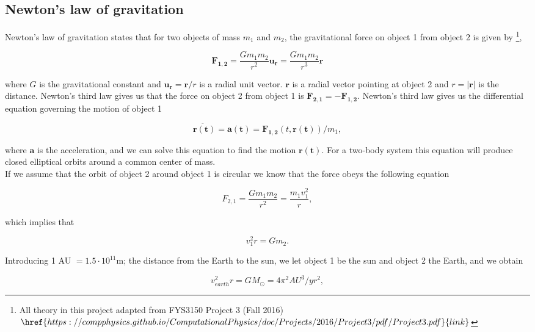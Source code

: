 \documentclass[%
 reprint,
 nobalance,
 amsmath,amssymb,
 aps,
]{revtex4-1}
\begin{document}
\subsection{\label{sec:New}Newton's law of gravitation}
Newton's law of gravitation states that for two objects of mass $m_1$ and $m_2$, the gravitational force on object 1 from object 2 is given by \footnote{All theory in this project adapted from FYS3150 Project 3 (Fall 2016) $\href{https://compphysics.github.io/ComputationalPhysics/doc/Projects/2016/Project3/pdf/Project3.pdf}{link}$},

\begin{equation}
	\bm{F_{1,2}} = \frac{Gm_1 m_2}{r^2} \bm{u_r} = \frac{Gm_1 m_2}{r^3} \bm{r}
\end{equation}

where $G$ is the gravitational constant and $\bm{u_r} = \bm{r}/r$ is a radial unit vector. $\bm{r}$ is a radial vector pointing at object 2 and $r = \left|\bm{r}\right| $ is the distance. Newton's third law gives us that the force on object 2 from object 1 is $\bm{F_{2,1}} = - \bm{F_{1,2}}$. Newton's third law gives us the differential equation governing the motion of object 1

\begin{equation}
	\bm{\ddot{r(t)}} = \bm{a(t)} = \bm{F_{1,2}}(t, \bm{r(t)})/m_1,
\end{equation}

where $\bm{a}$ is the acceleration, and we can solve this equation to find the motion $\bm{r(t)}$. For a two-body system this equation will produce closed elliptical orbits around a common center of mass.\\
If we assume that the orbit of object 2 around object 1 is circular we know that the force obeys the following equation

\begin{equation}
	F_{2,1} = \frac{Gm_1 m_2}{r^2} = \frac{m_1 v_{1}^{2}}{r},
\end{equation}

which implies that

\begin{equation}
	v_{1}^{2}r = G m_2.
\end{equation}

Introducing 1 AU $= 1.5\cdot10^{11}$m; the distance from the Earth to the sun, we let object 1 be the sun and object 2 the Earth, and we obtain

\begin{equation}
	v_{earth}^2 r = G M_{\odot} = 4\pi^{2} AU^{3}/yr^{2},
\end{equation}
\end{document}
